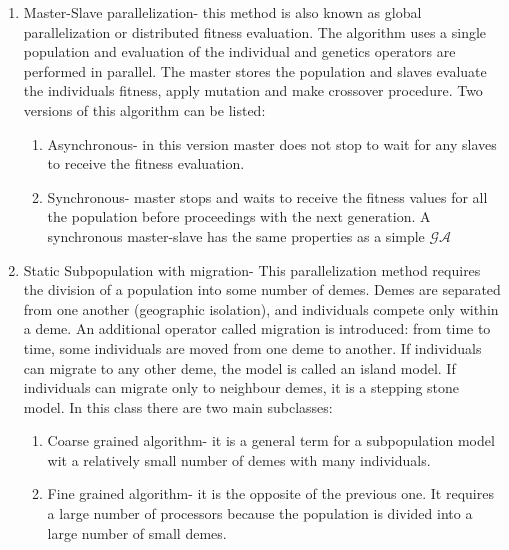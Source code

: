 \begin{enumerate}
	\item Master-Slave parallelization- this method is also known as global
		parallelization or distributed fitness evaluation. The algorithm uses a
		single population and evaluation of the individual and genetics
		operators are performed in parallel. The master stores the population
		and slaves evaluate the individuals fitness, apply mutation and make crossover
		procedure. Two versions of this algorithm can be listed:
		\begin{enumerate}
			\item Asynchronous- in this version master does not stop to wait for
				any slaves to receive the fitness evaluation.
			\item Synchronous- master stops and waits to receive the  fitness
				values for all the population before proceedings with the next
				generation. A synchronous master-slave has the same properties
				as a simple $\mathcal{GA}$
		\end{enumerate}
	\item Static Subpopulation with migration- This parallelization method requires 
		the division of a population into some number of demes. Demes
		 are separated from one another (geographic isolation), and individuals compete only
		 within a deme. An additional operator
		 called migration is introduced: from time to time, some individuals are moved 
		 from one deme to another. If individuals can migrate to any other deme, 
		 the model is called
		 an island model. If individuals can migrate only to neighbour demes, it
		 is a stepping stone model. In this class there are two main subclasses:
		 \begin{enumerate}
			 \item Coarse grained algorithm- it is a general term for a
				 subpopulation model wit a relatively small number of demes with
				 many individuals. 
			 \item Fine grained algorithm- it is the opposite of the previous
				 one. It requires a large number of processors because the
				 population is divided into a large number of small demes. 
		 \end{enumerate}
		

\end{enumerate}
